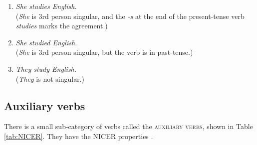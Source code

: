 \begin{enumerate}[noitemsep]
    \item     \noindent\textit{She studies English.} \\(\textit{She} is 3rd person singular, and the \textit{-s} at the end of the present-tense verb \textit{studies} marks the agreement.)
    \item \textit{She studied English.} \\(\textit{She} is 3rd person singular, but the verb is in past-tense.)
    \item \textit{They study English.} \\(\textit{They} is not singular.)
\end{enumerate}

\subsection{Auxiliary verbs}\label{sec:aux}

There is a small sub-category of verbs called the \textsc{auxiliary verbs}, shown in Table \ref{tab:NICER}. They have the \textsc{NICER} properties \citep{sag2019}.

